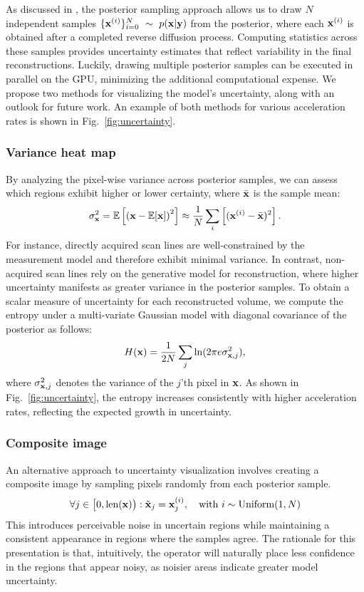 \documentclass[journal,twoside,web,dvipsnames]{ieeecolor}          %
\begin{document}
As discussed in , the posterior sampling approach allows us to draw $N$ independent samples $\{{\mathbf{x}}^{(i)}\}_{i=0}^N~\sim~p({\mathbf{x}}|{\mathbf{y}})$ from the posterior, where each ${\mathbf{x}}^{(i)}$ is obtained after a completed reverse diffusion process. Computing statistics across these samples provides uncertainty estimates that reflect variability in the final reconstructions. Luckily, drawing multiple posterior samples can be executed in parallel on the GPU, minimizing the additional computational expense. We propose two methods for visualizing the model's uncertainty, along with an outlook for future work. An example of both methods for various acceleration rates is shown in Fig.~\ref{fig:uncertainty}.

\subsubsection{Variance heat map} By analyzing the pixel-wise variance across posterior samples, we can assess which regions exhibit higher or lower certainty, where $\bar{{\mathbf{x}}}$ is the sample mean:
\begin{equation}
\sigma_{\mathbf{x}}^2 = \mathbb{E}\left[ \left( {\mathbf{x}} - \mathbb{E}[{\mathbf{x}}] \right)^2 \right] \approx \frac{1}{N}\sum_i\left[ ({\mathbf{x}}^{(i)} - \bar{{\mathbf{x}}})^2\right].
\end{equation}
For instance, directly acquired scan lines are well-constrained by the measurement model and therefore exhibit minimal variance. In contrast, non-acquired scan lines rely on the generative model for reconstruction, where higher uncertainty manifests as greater variance in the posterior samples. To obtain a scalar measure of uncertainty for each reconstructed volume, we compute the entropy under a multi-variate Gaussian model with diagonal covariance of the posterior as follows:
\begin{equation}
    H({\mathbf{x}}) = \frac{1}{2N} \sum_j \ln(2\pi e \sigma_{{\mathbf{x}}, j}^2),
\end{equation}
where $\sigma_{{\mathbf{x}}, j}^2$ denotes the variance of the $j$'th pixel in ${\mathbf{x}}$. As shown in Fig.~\ref{fig:uncertainty}, the entropy increases consistently with higher acceleration rates, reflecting the expected growth in uncertainty.

\subsubsection{Composite image} An alternative approach to uncertainty visualization involves creating a composite image by sampling pixels randomly from each posterior sample.
\begin{equation}
    \forall j\in\big[0, \text{len}({\mathbf{x}})\big): \tilde{{\mathbf{x}}}_j = {\mathbf{x}}^{(i)}_j, \quad \text{with } i \sim \text{Uniform}(1, N)
\end{equation}
This introduces perceivable noise in uncertain regions while maintaining a consistent appearance in regions where the samples agree. The rationale for this presentation is that, intuitively, the operator will naturally place less confidence in the regions that appear noisy, as noisier areas indicate greater model uncertainty.
\end{document}
